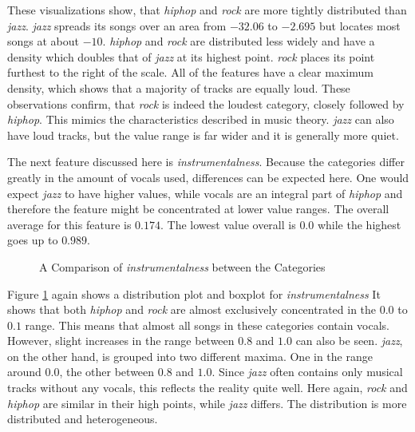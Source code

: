 These visualizations show, that \emph{hiphop} and \emph{rock} are more tightly distributed than \emph{jazz}.
\emph{jazz} spreads its songs over an area from \(-32.06\) to \(-2.695\) but locates
most songs at about \(-10\). \emph{hiphop} and \emph{rock} are distributed less widely and have 
a density which doubles that of \emph{jazz} at its highest point.
\emph{rock} places its point furthest to the right of the scale.
All of the features have a clear maximum density, which shows that a majority of tracks
are equally loud.
These observations confirm, that \emph{rock} is indeed the loudest category, closely followed by \emph{hiphop}.
This mimics the characteristics described in music theory.
\emph{jazz} can also have loud tracks, but the value range is far wider and it is generally more quiet.

The next feature discussed here is \emph{instrumentalness}.
Because the categories differ greatly in the amount of vocals used, differences can be expected here.
One would expect \emph{jazz} to have higher values, while vocals are an integral part of \emph{hiphop} 
and therefore the feature might be concentrated at lower value ranges.
The overall average for this feature is \(0.174\).
The lowest value overall is \(0.0\) while the highest goes up to \(0.989\).

\begin{figure}[H]
    \centering
    \qquad
    \caption{A Comparison of \emph{instrumentalness} between the Categories}%
    \label{fig:du_dp_bp_instr_categorie_dependent}%
\end{figure}

Figure \ref{fig:du_dp_bp_instr_categorie_dependent} again shows a distribution plot and boxplot for \emph{instrumentalness}
It shows that both \emph{hiphop} and \emph{rock} are almost exclusively concentrated in the \(0.0\) to \(0.1\) range.
This means that almost all songs in these categories contain vocals.
However, slight increases in the range between \(0.8\) and \(1.0\) can also be seen.
\emph{jazz}, on the other hand, is grouped into two different maxima. One in the range around \(0.0\),
the other between \(0.8\) and \(1.0\). Since \emph{jazz} often contains only musical tracks without
any vocals, this reflects the reality quite well.
Here again, \emph{rock} and \emph{hiphop} are similar in their high points, while \emph{jazz} differs.
The distribution is more distributed and heterogeneous.


